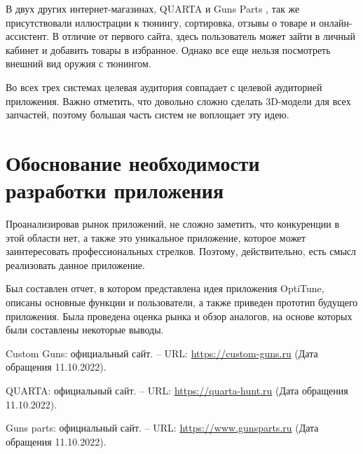 \documentclass[14pt]{extreport}
\begin{document}
В двух других интернет-магазинах, QUARTA \cite{bib2} и Guns Parts \cite{bib3}, так же присутствовали иллюстрации к тюнингу, сортировка, отзывы о товаре и онлайн-ассистент. В отличие от первого сайта, здесь пользователь может зайти в личный кабинет и добавить товары в избранное. Однако все еще нельзя посмотреть внешний вид оружия с тюнингом. 

Во всех трех системах целевая аудитория совпадает с целевой аудиторией приложения. Важно отметить, что довольно сложно сделать 3D-модели для всех запчастей, поэтому большая часть систем не воплощает эту идею. 


\newpage
\section{Обоснование необходимости разработки приложения}

Проанализировав рынок приложений, не сложно заметить, что конкуренции в этой области нет, а также это уникальное приложение, которое может заинтересовать профессиональных стрелков. Поэтому, действительно, есть смысл реализовать данное приложение.


\conclusions

Был составлен отчет, в котором представлена идея приложения OptiTune, описаны основные функции и пользователи, а также приведен прототип будущего приложения. Была проведена оценка рынка и обзор аналогов, на основе которых были составлены некоторые выводы.



\newpage
\begin{thebibliography}{99}

 Custom Guns: официальный сайт. – URL: \url{https://custom-guns.ru} (Дата обращения 11.10.2022).

 QUARTA: официальный сайт. – URL: \url{https://quarta-hunt.ru} (Дата обращения 11.10.2022).

 Guns parts: официальный сайт. – URL: \url{https://www.gunsparts.ru} (Дата обращения 11.10.2022).



\end{thebibliography}
\end{document}
